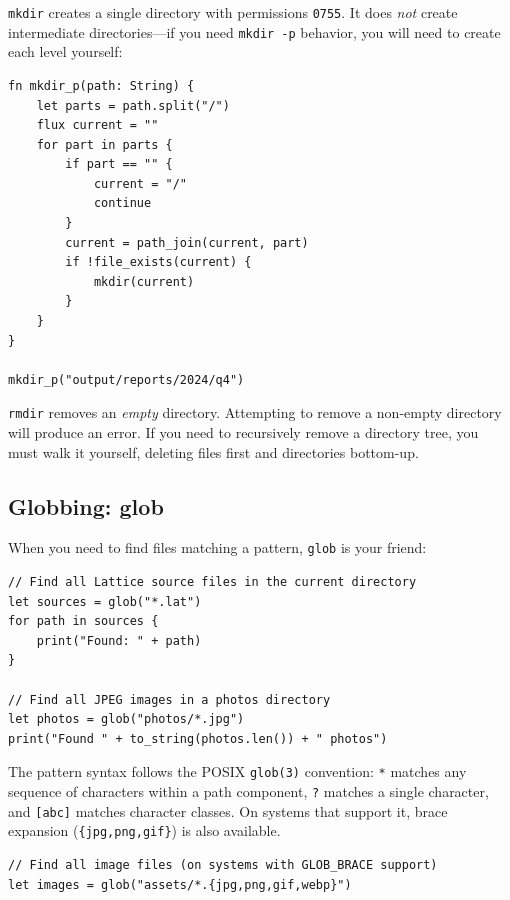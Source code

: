 \lstinline|mkdir| creates a single directory with permissions \texttt{0755}.
It does \emph{not} create intermediate directories---if you need
\texttt{mkdir -p} behavior, you will need to create each level yourself:

\begin{lstlisting}[language=Lattice, caption={Creating nested directories}]
fn mkdir_p(path: String) {
    let parts = path.split("/")
    flux current = ""
    for part in parts {
        if part == "" {
            current = "/"
            continue
        }
        current = path_join(current, part)
        if !file_exists(current) {
            mkdir(current)
        }
    }
}

mkdir_p("output/reports/2024/q4")
\end{lstlisting}

\lstinline|rmdir| removes an \emph{empty} directory. Attempting to remove a
non-empty directory will produce an error. If you need to recursively remove a
directory tree, you must walk it yourself, deleting files first and
directories bottom-up.

\subsection{Globbing: glob}\label{sec:glob}


When you need to find files matching a pattern, \lstinline|glob| is your
friend:

\begin{lstlisting}[language=Lattice, caption={Finding files with glob patterns}]
// Find all Lattice source files in the current directory
let sources = glob("*.lat")
for path in sources {
    print("Found: " + path)
}

// Find all JPEG images in a photos directory
let photos = glob("photos/*.jpg")
print("Found " + to_string(photos.len()) + " photos")
\end{lstlisting}

The pattern syntax follows the POSIX \texttt{glob(3)} convention:
\texttt{*} matches any sequence of characters within a path component,
\texttt{?} matches a single character, and \texttt{[abc]} matches character
classes. On systems that support it, brace expansion
(\texttt{\{jpg,png,gif\}}) is also available.

\begin{lstlisting}[language=Lattice, caption={Brace expansion in glob patterns}]
// Find all image files (on systems with GLOB_BRACE support)
let images = glob("assets/*.{jpg,png,gif,webp}")
\end{lstlisting}


